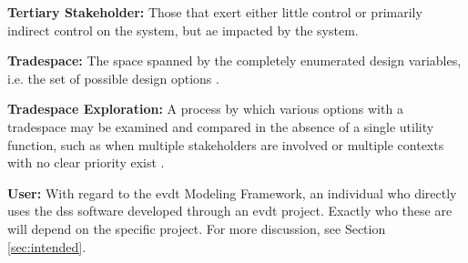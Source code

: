 \textbf{Tertiary Stakeholder:} Those that exert either little control or primarily indirect control on the system, but ae impacted by the system.

\textbf{Tradespace:}  The space spanned by the completely enumerated design variables, i.e. the set of possible design options \cite{rossTradespaceExplorationParadigm2005}.

\textbf{Tradespace Exploration:} A process by which various options with a tradespace may be examined and compared in the absence of a single utility function, such as when multiple stakeholders are involved or multiple contexts with no clear priority exist \cite{rossTradespaceExplorationParadigm2005}.

\textbf{User:} With regard to the \ac{evdt} Modeling Framework, an individual who directly uses the \ac{dss} software developed through an \ac{evdt} project. Exactly who these are will depend on the specific project. For more discussion, see Section \ref{sec:intended}.

\clearpage
\newpage
